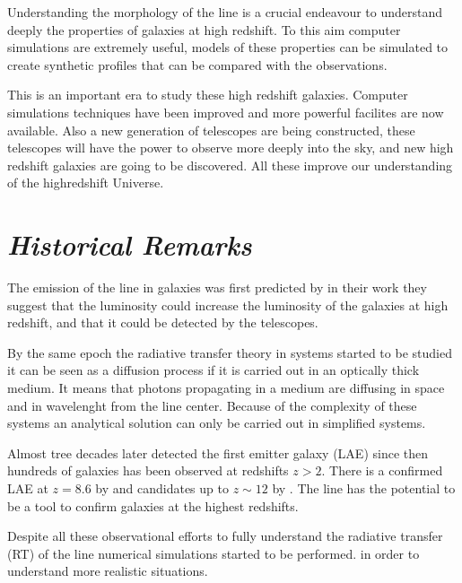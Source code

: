 Understanding the morphology of the \ly line is a crucial endeavour 
to understand deeply the properties of galaxies at high redshift. To this aim 
computer simulations are extremely useful, models of these properties 
can be simulated to create synthetic profiles that can be compared
with the observations. 

This is an important era to study these high redshift galaxies. Computer 
simulations techniques have been improved and more powerful facilites are
now available. Also a new generation of telescopes are being constructed,
these telescopes will have the power to observe more deeply into the sky, 
and new high redshift galaxies are going to be discovered. All these  
improve our understanding of the highredshift Universe. 



\section{\emph{Historical Remarks}}

The emission of the \ly line in galaxies was first predicted by 
\citep{PartridgePeebles} in their work they suggest that the \ly luminosity
could increase the luminosity of the galaxies at high redshift, and that 
it could be detected by the telescopes. 

By the same epoch the radiative transfer theory in \ly systems started to be
 studied \citep{Osterbrock62, Adams72, Harrington73, Neufeld90}
 it can be seen as a diffusion process if it is carried out in 
 an optically thick medium. It means that \ly photons propagating 
in a medium are diffusing in space and in wavelenght from the line center.   
Because of the complexity of these systems an analytical solution 
can only be carried out in simplified systems. 


Almost tree decades later \citep{DjorgovskiThomson92} detected the first \ly 
emitter galaxy (LAE) since then hundreds of galaxies has been  
observed at redshifts $z>2$. There is a confirmed LAE at $z=8.6$ 
by \citep{Lenhert2010} and candidates up to $z\sim12$ by \citep{Brammer13}. 
The \ly line has the potential to be a tool to confirm galaxies at the highest 
redshifts. 

Despite all these observational efforts to fully understand the radiative
transfer (RT) of the \ly line numerical simulations started to be performed.
\citep{DijkstraKramer, Laursen09, Verhamme06, CLARA}
in order to understand more realistic situations.


